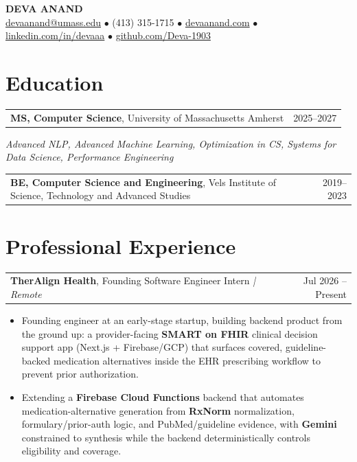 \documentclass[letterpaper,11pt]{article}
\makeatletter
\newcommand{\eduItem}[3]{%
  \begin{tabular*}{\textwidth}{@{}l@{\extracolsep{\fill}}r@{}}
    \textbf{#1}, #2 & #3 \\
  \end{tabular*}\par
}
\newcommand{\expItem}[4]{%
  \vspace{2pt}
  \begin{tabular*}{\textwidth}{@{}l@{\extracolsep{\fill}}r@{}}
    \textbf{#1}, #2 \textit{| #3} & #4 \\
  \end{tabular*}\par\vspace{-3pt}
}
\makeatother
\begin{document}
\begin{center}
    {\fontsize{18}{20}\selectfont\bfseries DEVA ANAND}\\ \vspace{3pt}
    {\small
    \href{mailto:devaanand@umass.edu}{devaanand@umass.edu}
    \enspace$\bullet$\enspace
    (413) 315-1715
    \enspace$\bullet$\enspace
    \href{https://devaanand.com}{devaanand.com}
    \enspace$\bullet$\enspace
    \href{https://linkedin.com/in/devaaa/}{linkedin.com/in/devaaa}
    \enspace$\bullet$\enspace
    \href{https://github.com/Deva-1903}{github.com/Deva-1903}}
\end{center}
\vspace{-8pt}

\section{Education}
\eduItem{MS, Computer Science}{University of Massachusetts Amherst}{2025--2027}
{\small\textit{Advanced NLP, Advanced Machine Learning, Optimization in CS, Systems for Data Science, Performance Engineering}}\par
\vspace{3pt}
\eduItem{BE, Computer Science and Engineering}{Vels Institute of Science, Technology and Advanced Studies}{2019--2023}

\section{Professional Experience}

\expItem{TherAlign Health}{Founding Software Engineer Intern}{Remote}{Jul 2026 -- Present}
\begin{itemize}
  \item Founding engineer at an early-stage startup, building backend product from the ground up: a provider-facing \textbf{SMART on FHIR} clinical decision support app (Next.js + Firebase/GCP) that surfaces covered, guideline-backed medication alternatives inside the EHR prescribing workflow to prevent prior authorization.
  \item Extending a \textbf{Firebase Cloud Functions} backend that automates medication-alternative generation from \textbf{RxNorm} normalization, formulary/prior-auth logic, and PubMed/guideline evidence, with \textbf{Gemini} constrained to synthesis while the backend deterministically controls eligibility and coverage.
\end{itemize}
\end{document}
